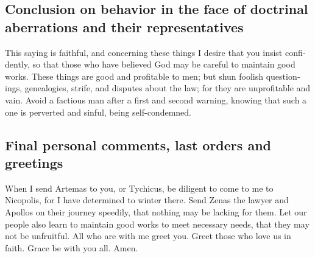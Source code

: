 \begin{paracol}{2}
\begin{otherlanguage}{english}
\hypertarget{conclusion-on-behavior-in-the-face-of-doctrinal-aberrations-and-their-representatives}{%
\subsection{Conclusion on behavior in the face of doctrinal aberrations
and their
representatives}\label{conclusion-on-behavior-in-the-face-of-doctrinal-aberrations-and-their-representatives}}

 This saying is faithful, and concerning these things I
desire that you insist confidently, so that those who have believed God
may be careful to maintain good works. These things are good and
profitable to men;  but shun foolish questionings,
genealogies, strife, and disputes about the law; for they are
unprofitable and vain.  Avoid a factious man after a
first and second warning,  knowing that such a one is
perverted and sinful, being self-condemned.

\hypertarget{final-personal-comments-last-orders-and-greetings}{%
\subsection{Final personal comments, last orders and
greetings}\label{final-personal-comments-last-orders-and-greetings}}

 When I send Artemas to you, or Tychicus, be diligent to
come to me to Nicopolis, for I have determined to winter there.
 Send Zenas the lawyer and Apollos on their journey
speedily, that nothing may be lacking for them.  Let our
people also learn to maintain good works to meet necessary needs, that
they may not be unfruitful.  All who are with me greet
you. Greet those who love us in faith. Grace be with you all. Amen.
\end{otherlanguage} \end{paracol}
